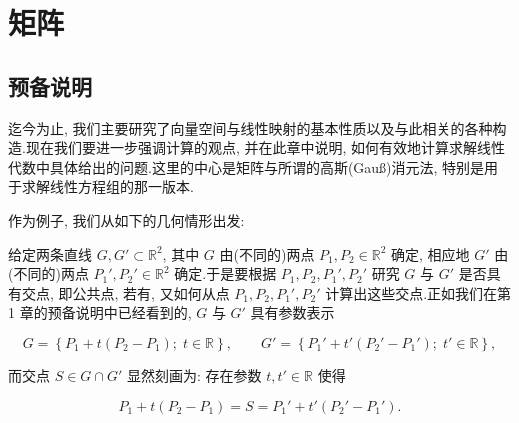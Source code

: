 \chapter{矩阵}

\section*{预备说明}

迄今为止, 我们主要研究了向量空间与线性映射的基本性质以及与此相关的各种构造.现在我们要进一步强调计算的观点, 并在此章中说明, 如何有效地计算求解线性代数中具体给出的问题.这里的中心是矩阵与所谓的高斯(Gauß)消元法, 特别是用于求解线性方程组的那一版本.

作为例子, 我们从如下的几何情形出发:

\begin{center}
\end{center}

给定两条直线 $G, G' \subset \mathbb{R}^2$, 其中 $G$ 由(不同的)两点 $P_1, P_2 \in \mathbb{R}^2$ 确定, 相应地 $G'$ 由(不同的)两点 $P_1', P_2' \in \mathbb{R}^2$ 确定.于是要根据 $P_1, P_2, P_1', P_2'$ 研究 $G$ 与 $G'$ 是否具有交点, 即公共点, 若有, 又如何从点 $P_1, P_2, P_1', P_2'$ 计算出这些交点.正如我们在第 1 章的预备说明中已经看到的, $G$ 与 $G'$ 具有参数表示

\[
G = \left\{P_1 + t(P_2 - P_1);\; t \in \mathbb{R}\right\}, \qquad
G' = \left\{P_1' + t'(P_2' - P_1');\; t' \in \mathbb{R}\right\},
\]

而交点 $S \in G \cap G'$ 显然刻画为: 存在参数 $t, t' \in \mathbb{R}$ 使得

\[
P_1 + t(P_2 - P_1) = S = P_1' + t'(P_2' - P_1')\text{.}
\]


